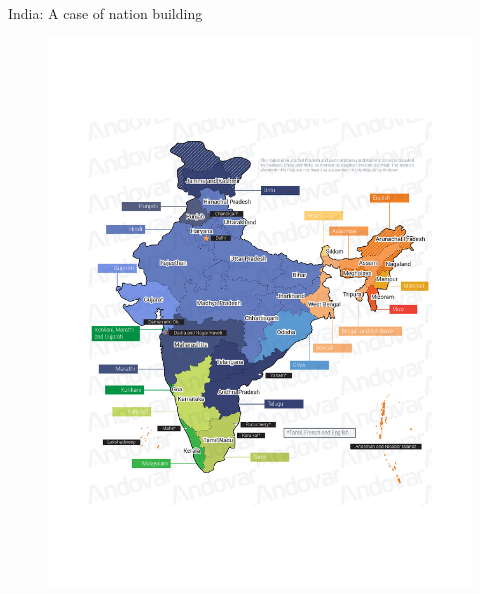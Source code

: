 \documentclass[10pt]{beamer}
\begin{document}
\begin{frame}{India: A case of nation building}
	\begin{figure}
	\centering
	\includegraphics[scale=0.45]{Figs/India/india}
	\end{figure}
\end{frame}
\end{document}
